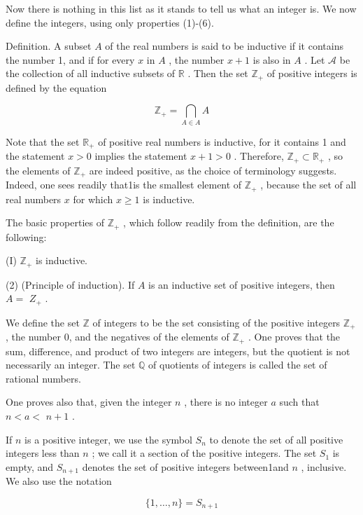 Now there is nothing in this list as it stands to tell us what an integer is. We now define the integers, using only properties (1)-(6).

Definition. A subset \(A\) of the real numbers is said to be inductive if it contains the number 1, and if for every \(x\) in \(A\) , the number \(x + 1\) is also in \(A\) . Let \(\mathcal{A}\) be the collection of all inductive subsets of \(\mathbb{R}\) . Then the set \({\mathbb{Z}}_{ + }\) of positive integers is defined by the equation

\[
{\mathbb{Z}}_{ + } = \mathop{\bigcap }\limits_{{A \in  A}}A
\]

Note that the set \({\mathbb{R}}_{ + }\) of positive real numbers is inductive, for it contains 1 and the statement \(x > 0\) implies the statement \(x + 1 > 0\) . Therefore, \({\mathbb{Z}}_{ + } \subset  {\mathbb{R}}_{ + }\) , so the elements of \({\mathbb{Z}}_{ + }\) are indeed positive, as the choice of terminology suggests. Indeed, one sees readily that1is the smallest element of \({\mathbb{Z}}_{ + }\) , because the set of all real numbers \(x\) for which \(x \geq  1\) is inductive.

The basic properties of \({\mathbb{Z}}_{ + }\) , which follow readily from the definition, are the following:

(I) \({\mathbb{Z}}_{ + }\) is inductive.

(2) (Principle of induction). If \(A\) is an inductive set of positive integers, then \(A =\)  \({Z}_{ + }\) .

We define the set \(\mathbb{Z}\) of integers to be the set consisting of the positive integers \({\mathbb{Z}}_{ + }\) , the number 0, and the negatives of the elements of \({\mathbb{Z}}_{ + }\) . One proves that the sum, difference, and product of two integers are integers, but the quotient is not necessarily an integer. The set \(\mathbb{Q}\) of quotients of integers is called the set of rational numbers.

One proves also that, given the integer \(n\) , there is no integer \(a\) such that \(n < a <\)  \(n + 1\) .

If \(n\) is a positive integer, we use the symbol \({S}_{n}\) to denote the set of all positive integers less than \(n\) ; we call it a section of the positive integers. The set \({S}_{1}\) is empty, and \({S}_{n + 1}\) denotes the set of positive integers between1and \(n\) , inclusive. We also use the notation

\[
\{ 1,\ldots ,n\}  = {S}_{n + 1}
\]


